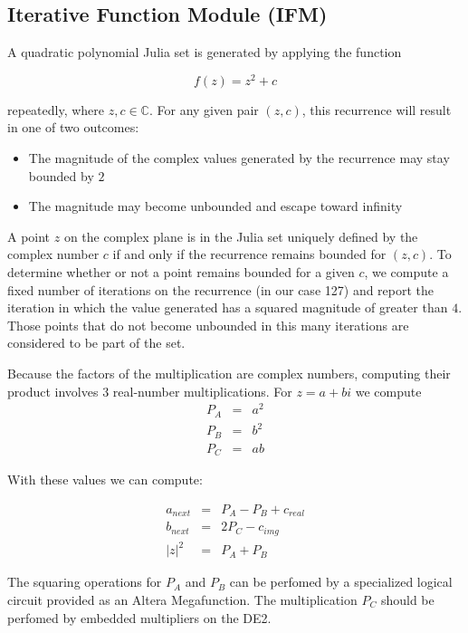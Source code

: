 \documentclass{article}
\begin{document}
\subsection{Iterative Function Module (IFM)}

A quadratic polynomial Julia set is generated by applying the function

\begin{equation}
f(z) = z^2 + c
\end{equation}

repeatedly, where $z,c \in \mathbb{C}$. For any given pair $(z, c)$,
this recurrence will result in one of two outcomes:
\begin{itemize}
\item The magnitude of the complex values generated by the recurrence
  may stay bounded by $2$
\item The magnitude may become unbounded and escape toward infinity
\end{itemize}

A point $z$ on the complex plane is in the Julia set uniquely defined
by the complex number $c$ if and only if the recurrence remains
bounded for $(z, c)$. To determine whether or not a point remains
bounded for a given $c$, we compute a fixed number of iterations on
the recurrence (in our case 127) and report the iteration in which the
value generated has a squared magnitude of greater than $4$. Those
points that do not become unbounded in this many iterations are
considered to be part of the set.

Because the factors of the multiplication are complex numbers,
computing their product involves 3 real-number multiplications. For $z
= a + bi$ we compute\\

\begin{eqnarray}
P_A &=& a^2 \nonumber \\
P_B &=& b^2 \nonumber \\
P_C &=& ab \nonumber
\end{eqnarray}

With these values we can compute:

\begin{eqnarray}
a_{next} &=& P_A - P_B + c_{real}\nonumber \\
b_{next} &=& 2P_C - c_{img} \nonumber \\
|z|^2 &=& P_A + P_B \nonumber 
\end{eqnarray}

The squaring operations for $P_A$ and $P_B$ can be perfomed by a
specialized logical circuit provided as an Altera Megafunction. The
multiplication $P_C$ should be perfomed by embedded multipliers on the
DE2.
\end{document}
